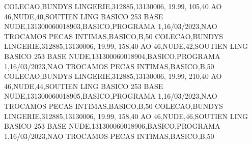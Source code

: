 COLECAO,BUNDYS LINGERIE,312885,13130006,    19.99,   105,40 AO 46,NUDE,40,SOUTIEN LING BASICO 253 BASE NUDE,131300060018903,BASICO,PROGRAMA 1,16/03/2023,NAO TROCAMOS PECAS INTIMAS,BASICO,B,50
COLECAO,BUNDYS LINGERIE,312885,13130006,    19.99,   158,40 AO 46,NUDE,42,SOUTIEN LING BASICO 253 BASE NUDE,131300060018904,BASICO,PROGRAMA 1,16/03/2023,NAO TROCAMOS PECAS INTIMAS,BASICO,B,50
COLECAO,BUNDYS LINGERIE,312885,13130006,    19.99,   210,40 AO 46,NUDE,44,SOUTIEN LING BASICO 253 BASE NUDE,131300060018905,BASICO,PROGRAMA 1,16/03/2023,NAO TROCAMOS PECAS INTIMAS,BASICO,B,50
COLECAO,BUNDYS LINGERIE,312885,13130006,    19.99,   158,40 AO 46,NUDE,46,SOUTIEN LING BASICO 253 BASE NUDE,131300060018906,BASICO,PROGRAMA 1,16/03/2023,NAO TROCAMOS PECAS INTIMAS,BASICO,B,50
